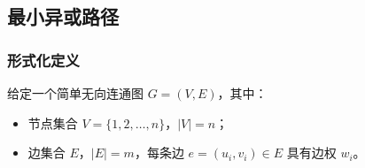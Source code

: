 \documentclass[../mainReport.tex]{subfiles}
\begin{document}


    
    
        
        
            

    
    
    
    
    

\subsection{最小异或路径}
\subsubsection{形式化定义}
给定一个简单无向连通图 $ G = (V, E) $，其中：
\begin{itemize}
    \item 节点集合 $ V = \{1, 2, \dots, n\} $，$ |V| = n $；
    \item 边集合 $ E $，$ |E| = m $，每条边 $ e = (u_i, v_i) \in E $ 具有边权 $ w_i $。
\end{itemize}
\end{document}
